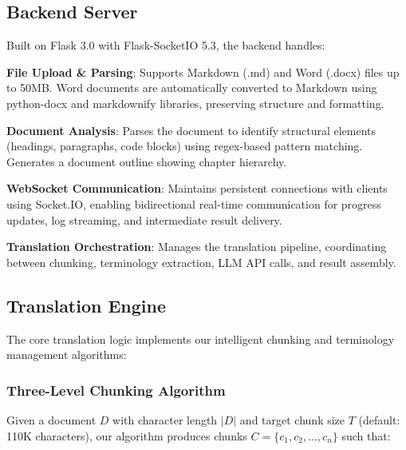 \documentclass[11pt]{article}
\begin{document}
\subsection{Backend Server}

Built on Flask 3.0 with Flask-SocketIO 5.3, the backend handles:

\textbf{File Upload \& Parsing}: Supports Markdown (.md) and Word (.docx) files up to 50MB. Word documents are automatically converted to Markdown using python-docx and markdownify libraries, preserving structure and formatting.

\textbf{Document Analysis}: Parses the document to identify structural elements (headings, paragraphs, code blocks) using regex-based pattern matching. Generates a document outline showing chapter hierarchy.

\textbf{WebSocket Communication}: Maintains persistent connections with clients using Socket.IO, enabling bidirectional real-time communication for progress updates, log streaming, and intermediate result delivery.

\textbf{Translation Orchestration}: Manages the translation pipeline, coordinating between chunking, terminology extraction, LLM API calls, and result assembly.

\subsection{Translation Engine}

The core translation logic implements our intelligent chunking and terminology management algorithms:

\subsubsection{Three-Level Chunking Algorithm}

Given a document $D$ with character length $|D|$ and target chunk size $T$ (default: 110K characters), our algorithm produces chunks $C = \{c_1, c_2, ..., c_n\}$ such that:
\end{document}
